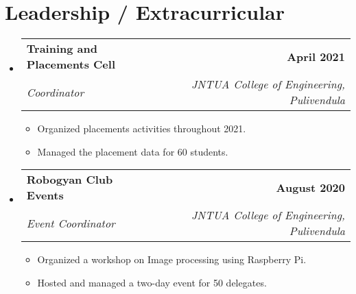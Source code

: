 \documentclass[letterpaper,11pt]{article}
\makeatletter
\newcommand{\resumeItem}[1]{
  \item\small{
    {#1 \vspace{-2pt}}
  }
}
\newcommand{\resumeSubheading}[4]{
  \vspace{-2pt}\item
    \begin{tabular*}{1.0\textwidth}[t]{l@{\extracolsep{\fill}}r}
      \textbf{#1} & \textbf{\small #2} \\
      \textit{\small#3} & \textit{\small #4} \\
    \end{tabular*}\vspace{-7pt}
}
\newcommand{\resumeSubHeadingListStart}{\begin{itemize}[leftmargin=0.0in, label={}]}
\newcommand{\resumeSubHeadingListEnd}{\end{itemize}}
\newcommand{\resumeItemListStart}{\begin{itemize}}
\newcommand{\resumeItemListEnd}{\end{itemize}\vspace{-5pt}}
\makeatother
\begin{document}
\section{Leadership / Extracurricular}
\resumeSubHeadingListStart
\resumeSubheading{Training and Placements Cell }{April 2021}{Coordinator}{JNTUA College of Engineering, Pulivendula}
\resumeItemListStart
\resumeItem{Organized placements activities throughout 2021.}
\resumeItem{Managed the placement data for 60 students.}
\resumeItemListEnd

\resumeSubheading{Robogyan Club Events}{August 2020}{Event Coordinator}{JNTUA College of Engineering, Pulivendula}
\resumeItemListStart
\resumeItem{Organized a workshop on Image processing using Raspberry Pi.}
\resumeItem{Hosted and managed a two-day event for 50 delegates.}
\resumeItemListEnd
\resumeSubHeadingListEnd
\end{document}
